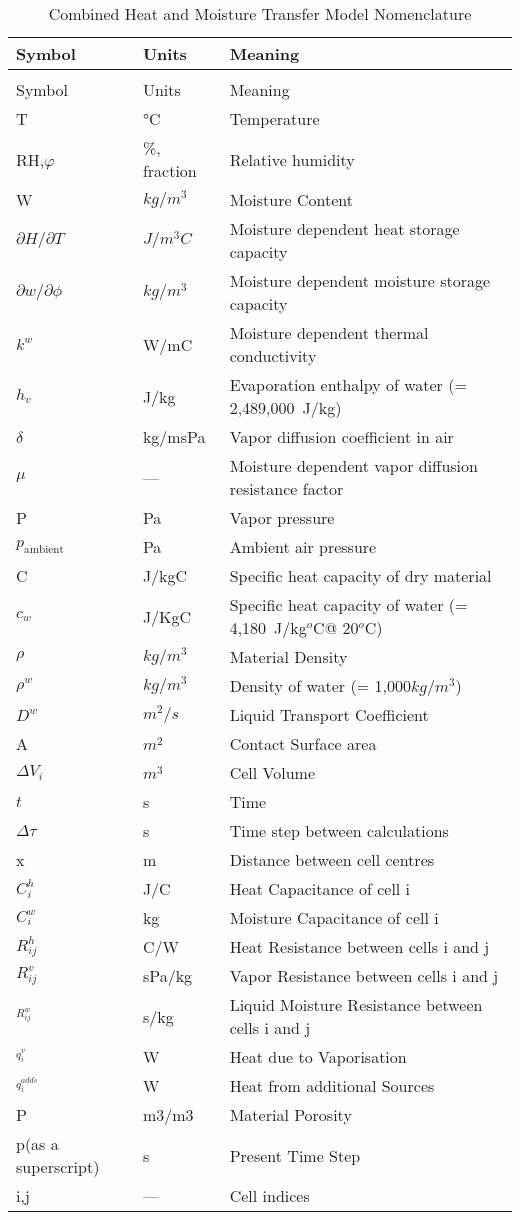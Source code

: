\begin{longtable}[c]{p{1.5in}p{1.0in}p{3.5in}}
\caption{Combined Heat and Moisture Transfer Model Nomenclature \label{table:combined-heat-and-moisture-transfer-model}} \tabularnewline
\toprule 
Symbol & Units & Meaning \tabularnewline
\midrule
\endfirsthead

\caption[]{Combined Heat and Moisture Transfer Model Nomenclature} \tabularnewline
\toprule 
Symbol & Units & Meaning \tabularnewline
\midrule
\endhead

T & \si{\celsius} & Temperature \tabularnewline
RH,$\varphi$ & \%, fraction & Relative humidity \tabularnewline
W & $kg/m^3$ & Moisture Content \tabularnewline
$\partial{H}/\partial{T}$ & $J/m^3C$ & Moisture dependent heat storage capacity \tabularnewline
$\partial{w}/\partial{\phi}$ & $kg/m^3$ & Moisture dependent moisture storage capacity \tabularnewline
${k^w}$ & W/mC & Moisture dependent thermal conductivity \tabularnewline
${h_v}$ & J/kg & Evaporation enthalpy of water (= 2,489,000~J/kg) \tabularnewline
$\delta$ & kg/msPa & Vapor diffusion coefficient in air \tabularnewline
$\mu$ & --- & Moisture dependent vapor diffusion resistance factor \tabularnewline
P & Pa & Vapor pressure \tabularnewline
$p_{\text{ambient}}$ & Pa & Ambient air pressure \tabularnewline
C & J/kgC & Specific heat capacity of dry material \tabularnewline
$c_{w}$ & J/KgC & Specific heat capacity of water (= 4,180~J/kg$^{o}$C@ 20$^{o}$C) \tabularnewline
$\rho$ & $kg/m^3$ & Material Density \tabularnewline
${\rho ^w}$ & $kg/m^3$ & Density of water (= 1,000$kg/m^3$) \tabularnewline
${D^w}$ & $m^2/s$ & Liquid Transport Coefficient \tabularnewline
A & $m^2$ & Contact Surface area \tabularnewline
$\Delta {V_i}$ & $m^3$ & Cell Volume \tabularnewline
$t$ & s & Time \tabularnewline
$\Delta \tau$ & s & Time step between calculations \tabularnewline
x & m & Distance between cell centres \tabularnewline
$C_i^h$ & J/C & Heat Capacitance of cell i \tabularnewline
$C_i^w$ & kg & Moisture Capacitance of cell i \tabularnewline
$R_{ij}^h$ & C/W & Heat Resistance between cells i and j \tabularnewline
$R_{ij}^v$ & sPa/kg & Vapor Resistance between cells i and j \tabularnewline
$^{R_{ij}^w}$ & s/kg & Liquid Moisture Resistance between cells i and j \tabularnewline
$^{q_i^v}$ & W & Heat due to Vaporisation \tabularnewline
$^{q_i^{adds}}$ & W & Heat from additional Sources \tabularnewline
P & m3/m3 & Material Porosity \tabularnewline
p(as a superscript) & s & Present Time Step \tabularnewline
i,j & --- & Cell indices \tabularnewline
\bottomrule
\end{longtable}

